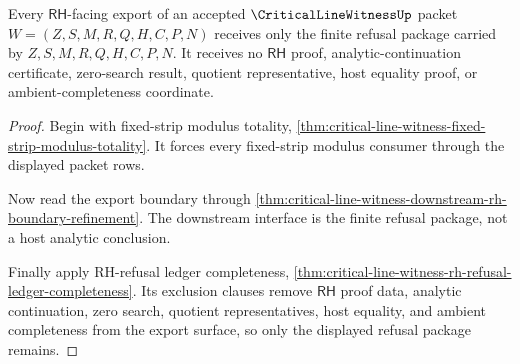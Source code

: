\begin{theorem}
\label{thm:critical-line-witness-rh-refusal-export-boundary}
Every $\mathsf{RH}$-facing export of an accepted $\CriticalLineWitnessUp$ packet $W=(Z,S,M,R,Q,H,C,P,N)$ receives only the finite refusal package carried by $Z,S,M,R,Q,H,C,P,N$. It receives no $\mathsf{RH}$ proof, analytic-continuation certificate, zero-search result, quotient representative, host equality proof, or ambient-completeness coordinate.
\end{theorem}
\begin{proof}
Begin with fixed-strip modulus totality, \autoref{thm:critical-line-witness-fixed-strip-modulus-totality}. It forces every fixed-strip modulus consumer through the displayed packet rows.

Now read the export boundary through \autoref{thm:critical-line-witness-downstream-rh-boundary-refinement}. The downstream interface is the finite refusal package, not a host analytic conclusion.

Finally apply RH-refusal ledger completeness, \autoref{thm:critical-line-witness-rh-refusal-ledger-completeness}. Its exclusion clauses remove $\mathsf{RH}$ proof data, analytic continuation, zero search, quotient representatives, host equality, and ambient completeness from the export surface, so only the displayed refusal package remains.
\end{proof}
